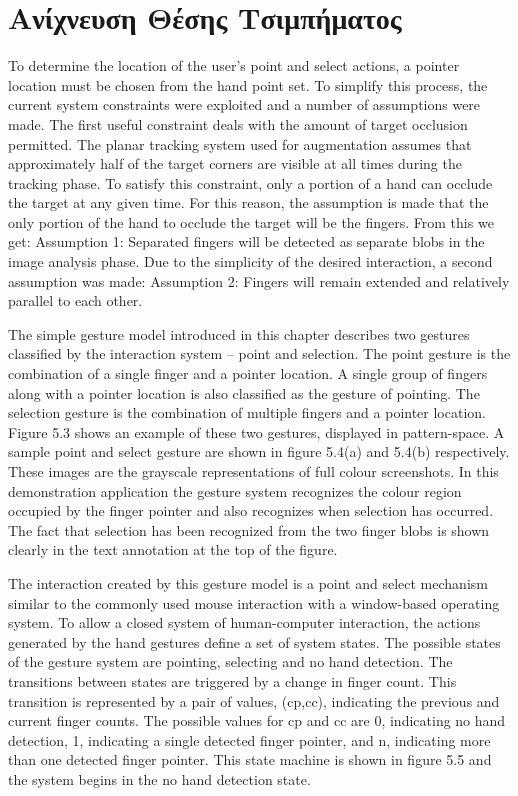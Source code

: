 \section{Ανίχνευση Θέσης Τσιμπήματος}


To determine the location of the user’s point and select actions, a pointer location must be chosen from the hand point set. To simplify this process, the current system constraints were exploited and a number of assumptions were made. The first useful constraint deals with the amount of target occlusion permitted. The planar tracking system used for augmentation assumes that approximately half of the target corners are visible at all times during the tracking phase. To satisfy this constraint, only a portion of a hand can occlude the target at any given time. For this reason, the assumption is made that the only portion of the hand to occlude the target will be the fingers. From this we get: Assumption 1: Separated fingers will be detected as separate blobs in the image analysis phase. Due to the simplicity of the desired interaction, a second assumption was made: Assumption 2: Fingers will remain extended and relatively parallel to each other.

The simple gesture model introduced in this chapter describes two gestures classified by the interaction system – point and selection. The point gesture is the combination of a single finger and a pointer location. A single group of fingers along with a pointer location is also classified as the gesture of pointing. The selection gesture is the combination of multiple fingers and a pointer location. Figure 5.3 shows an example of these two gestures, displayed in pattern-space. A sample point and select gesture are shown in figure 5.4(a) and 5.4(b) respectively. These images are the grayscale representations of full colour screenshots. In this demonstration application the gesture system recognizes the colour region occupied by the finger pointer and also recognizes when selection has occurred. The fact that selection has been recognized from the two finger blobs is shown clearly in the text annotation at the top of the figure.

The interaction created by this gesture model is a point and select mechanism similar to the commonly used mouse interaction with a window-based operating system. To allow a closed system of human-computer interaction, the actions generated by the hand gestures define a set of system states. The possible states of the gesture system are pointing, selecting and no hand detection. The transitions between states are triggered by a change in finger count. This transition is represented by a pair of values, (cp,cc), indicating the previous and current finger counts. The possible values for cp and cc are 0, indicating no hand detection, 1, indicating a single detected finger pointer, and n, indicating more than one detected finger pointer. This state machine is shown in figure 5.5 and the system begins in the no hand detection state.


